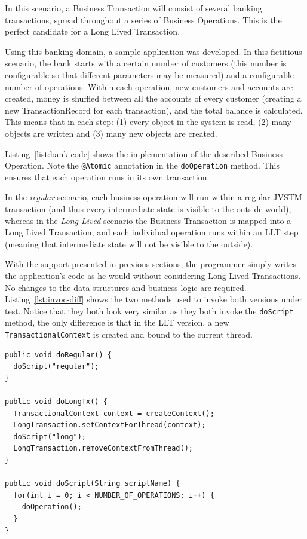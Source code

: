 \documentclass{llncs}
\begin{document}
In this scenario, a Business Transaction will consist of several
banking transactions, spread throughout a series of Business
Operations. This is the perfect candidate for a Long Lived
Transaction.

Using this banking domain, a sample application was developed. In this
fictitious scenario, the bank starts with a certain number of
customers (this number is configurable so that different parameters
may be measured) and a configurable number of operations. Within each
operation, new customers and accounts are created, money is shuffled
between all the accounts of every customer (creating a new
TransactionRecord for each transaction), and the total balance is
calculated. This means that in each step: (1) every object in the
system is read, (2) many objects are written and (3) many new objects
are created.

Listing~\ref{list:bank-code} shows the implementation of the described
Business Operation. Note the \texttt{@Atomic} annotation in the
\texttt{doOperation} method. This ensures that each operation runs in
its own transaction.

In the {\it regular} scenario, each business operation will run within
a regular JVSTM transaction (and thus every intermediate state is
visible to the outside world), whereas in the {\it Long Lived}
scenario the Business Transaction is mapped into a Long Lived
Transaction, and each individual operation runs within an LLT step
(meaning that intermediate state will not be visible to the outside).

With the support presented in previous sections, the programmer simply
writes the application's code as he would without considering Long
Lived Transactions. No changes to the data structures and business
logic are required. Listing~\ref{lst:invoc-diff} shows the two methods
used to invoke both versions under test. Notice that they both look
very similar as they both invoke the \texttt{doScript} method, the
only difference is that in the LLT version, a new
\texttt{TransactionalContext} is created and bound to the current
thread.

\begin{lstlisting}[caption={Invoking the business operation},
 label={lst:invoc-diff},float]
public void doRegular() {
  doScript("regular");
}

public void doLongTx() {
  TransactionalContext context = createContext();
  LongTransaction.setContextForThread(context);
  doScript("long");
  LongTransaction.removeContextFromThread();
}

public void doScript(String scriptName) {
  for(int i = 0; i < NUMBER_OF_OPERATIONS; i++) {
    doOperation();
  }
}
\end{lstlisting}
\end{document}
